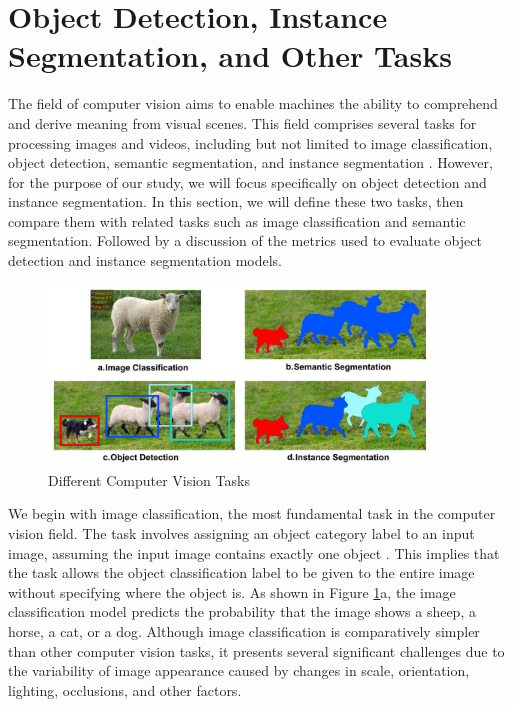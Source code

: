 \section{Object Detection, Instance Segmentation, and Other Tasks}  \label{sec:cv_tasks}

The field of computer vision aims to enable machines the ability to comprehend and derive meaning from visual scenes. This field comprises several tasks for processing images and videos, including but not limited to image classification, object detection, semantic segmentation, and instance segmentation \cite{overview_cv_task}. However, for the purpose of our study, we will focus specifically on object detection and instance segmentation. In this section, we will define these two tasks, then compare them with related tasks such as image classification and semantic segmentation. Followed by a discussion of the metrics used to evaluate object detection and instance segmentation models.

\begin{figure}[!ht]
    \centering
    \includegraphics[width=4in]{figures/diff_cv_tasks.jpeg}
    \caption{Different Computer Vision Tasks \cite{diff_detection_segmentation_task_fig}}
    \label{fig:diff_cv_tasks}
\end{figure}

We begin with image classification, the most fundamental task in the computer vision field. The task involves assigning an object category label to an input image, assuming the input image contains exactly one object \cite{overview_cv_task}. This implies that the task allows the object classification label to be given to the entire image without specifying where the object is. As shown in Figure \ref{fig:diff_cv_tasks}a, the image classification model predicts the probability that the image shows a sheep, a horse, a cat, or a dog. Although image classification is comparatively simpler than other computer vision tasks, it presents several significant challenges due to the variability of image appearance caused by changes in scale, orientation, lighting, occlusions, and other factors.

